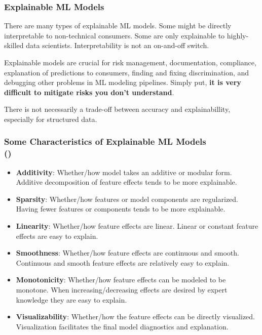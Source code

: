 \documentclass[11pt,aspectratio=169,hyperref={colorlinks}]{beamer}
\begin{document}
		\begin{frame}
	
			\frametitle{Explainable ML Models}			
	
			\small
			
			There are many types of explainable ML models. Some might be directly interpretable to non-technical consumers. Some are only explainable to highly-skilled data scientists. Interpretability is not an on-and-off switch.
			
			\vspace{10pt}
			
			Explainable models are crucial for risk management, documentation, compliance, explanation of predictions to consumers, finding and fixing discrimination, and  debugging other problems in ML modeling pipelines. Simply put, \textbf{it is very difficult to mitigate risks you don't understand}.
			
			\vspace{10pt}
			
			There is not necessarily a trade-off between accuracy and explainabillity, especially for structured data.
			
			\normalsize
			
		\end{frame}	

		\begin{frame}
	
			\frametitle{Some Characteristics of Explainable ML Models\\ (\small{\cite{sudjianto2021designing})}}			
			
			\small
			
			\begin{itemize}
				\item \textbf{Additivity}: Whether/how model takes an additive or modular form. Additive decomposition of feature effects tends to be more explainable.
				\item \textbf{Sparsity}: Whether/how features or model components are regularized. Having fewer features or components tends to be more explainable.
				\item \textbf{Linearity}: Whether/how feature effects are linear. Linear or constant feature effects are easy to explain.
				\item \textbf{Smoothness}: Whether/how feature effects are continuous and smooth. Continuous and smooth feature effects are relatively easy to explain.
				\item \textbf{Monotonicity}: Whether/how feature effects can be modeled to be monotone. When increasing/decreasing effects are desired by expert knowledge they are easy to explain.
				\item \textbf{Visualizability}: Whether/how the feature effects can be directly visualized. Visualization facilitates the final model diagnostics and explanation.
			\end{itemize}
			
			\normalsize
			
		\end{frame}	
\end{document}
